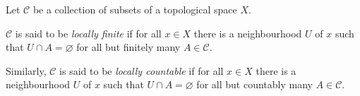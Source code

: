 \documentclass{article}
\begin{document}
Let $\mathcal{C}$ be a collection of subsets of a topological space $X$.

$\mathcal{C}$ is said to be \emph{locally finite}
if for all $x\in X$ there is a neighbourhood $U$ of $x$
such that $U \cap A = \varnothing$ for all but finitely many $A \in \mathcal{C}$.

Similarly, $\mathcal{C}$ is said to be \emph{locally countable}
if for all $x\in X$ there is a neighbourhood $U$ of $x$
such that $U \cap A = \varnothing$ for all but countably many $A \in \mathcal{C}$.
\end{document}
